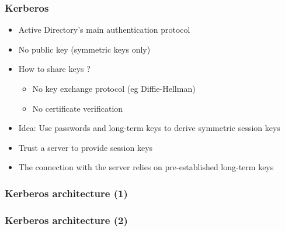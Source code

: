 \documentclass[
hyperref={pdfpagelabels=false}
,xcolor=table
]
{beamer}
\begin{document}
\begin{frame}
  \frametitle{Kerberos}
  \begin{itemize}
  \item Active Directory's main authentication protocol
  \item No public key (symmetric keys only)
  \item How to share keys ?
    \begin{itemize}
    \item No key exchange protocol (eg Diffie-Hellman)
    \item No certificate verification
    \end{itemize}
  \item Idea: Use passwords and long-term keys to derive symmetric session keys
  \item Trust a server to provide session keys
  \item The connection with the server relies on pre-established long-term keys
  \end{itemize}
\end{frame}

\begin{frame}
  \frametitle{Kerberos architecture (1)}
  
  \begin{center}
  \end{center}  

\end{frame}


\begin{frame}
  \frametitle{Kerberos architecture (2)}
  
  \begin{center}
  \end{center}  

\end{frame}
\end{document}
